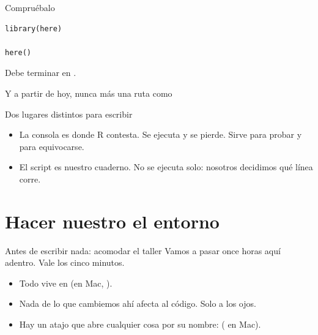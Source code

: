 \begin{frame}[fragile]{Compruébalo}
\begin{lstlisting}
library(here)

here()
\end{lstlisting}

  \vspace{0.8em}
  Debe terminar en .

  \vspace{0.7em}
  Y a partir de hoy, nunca más una ruta como
\end{frame}

\begin{frame}{Dos lugares distintos para escribir}
  \vspace{0.3em}
  \begin{itemize}\setlength{\itemsep}{1.0em}
    \item<1-> La \ac{consola} es donde R contesta. Se ejecuta y se pierde.
          Sirve para probar y para equivocarse.
    \item<2-> El \ac{script} es nuestro cuaderno. No se ejecuta solo:
          nosotros decidimos qué línea corre.
  \end{itemize}

  \vspace{1.3em}
\end{frame}

\section{Hacer nuestro el entorno}

\begin{frame}{Antes de escribir nada: acomodar el taller}
  \vspace{0.3em}
  Vamos a pasar once horas aquí adentro. Vale los cinco minutos.

  \vspace{1.0em}
  \begin{itemize}\setlength{\itemsep}{0.85em}
    \item<1-> Todo vive en 
          (en Mac, ).
    \item<2-> Nada de lo que cambiemos ahí afecta al código. Solo a los ojos.
    \item<3-> Hay un atajo que abre cualquier cosa por su nombre:
           ( en Mac).
  \end{itemize}
\end{frame}

